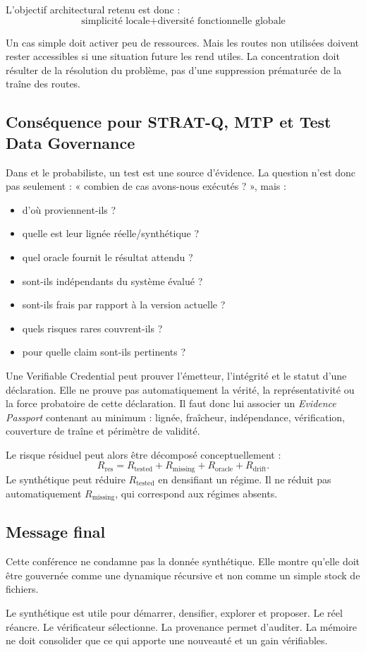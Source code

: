 L'objectif architectural retenu est donc :
\[
\boxed{\text{simplicité locale} + \text{diversité fonctionnelle globale}}
\]

Un cas simple doit activer peu de ressources. Mais les routes non utilisées doivent rester accessibles si une situation future les rend utiles. La concentration doit résulter de la résolution du problème, pas d'une suppression prématurée de la traîne des routes.

\subsection{Conséquence pour STRAT-Q, MTP et Test Data Governance}

Dans \STRATQ{} et le \MTP{} probabiliste, un test est une source d'évidence. La question n'est donc pas seulement : « combien de cas avons-nous exécutés ? », mais :

\begin{itemize}[leftmargin=*]
  \item d'où proviennent-ils ?
  \item quelle est leur lignée réelle/synthétique ?
  \item quel oracle fournit le résultat attendu ?
  \item sont-ils indépendants du système évalué ?
  \item sont-ils frais par rapport à la version actuelle ?
  \item quels risques rares couvrent-ils ?
  \item pour quelle claim sont-ils pertinents ?
\end{itemize}

Une Verifiable Credential peut prouver l'émetteur, l'intégrité et le statut d'une déclaration. Elle ne prouve pas automatiquement la vérité, la représentativité ou la force probatoire de cette déclaration. Il faut donc lui associer un \emph{Evidence Passport} contenant au minimum : lignée, fraîcheur, indépendance, vérification, couverture de traîne et périmètre de validité.

Le risque résiduel peut alors être décomposé conceptuellement :
\[
R_{\mathrm{res}} = R_{\mathrm{tested}} + R_{\mathrm{missing}} + R_{\mathrm{oracle}} + R_{\mathrm{drift}}.
\]
Le synthétique peut réduire $R_{\mathrm{tested}}$ en densifiant un régime. Il ne réduit pas automatiquement $R_{\mathrm{missing}}$, qui correspond aux régimes absents.

\subsection{Message final}

Cette conférence ne condamne pas la donnée synthétique. Elle montre qu'elle doit être gouvernée comme une dynamique récursive et non comme un simple stock de fichiers.

\begin{keyidea}
Le synthétique est utile pour démarrer, densifier, explorer et proposer. Le réel réancre. Le vérificateur sélectionne. La provenance permet d'auditer. La mémoire ne doit consolider que ce qui apporte une nouveauté et un gain vérifiables.
\end{keyidea}
